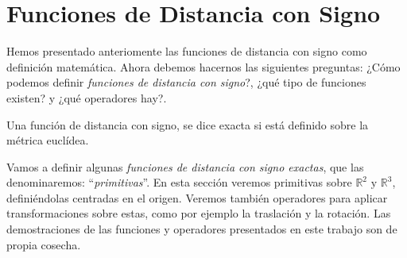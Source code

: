 \chapter{Funciones de Distancia con Signo\label{ch:fds}}
Hemos presentado anteriomente las funciones de distancia con signo como definición matemática. Ahora debemos hacernos las siguientes preguntas: ¿Cómo podemos definir \textit{funciones de distancia con signo}?, ¿qué tipo de funciones existen? y ¿qué operadores hay?.

\begin{definition}
Una función de distancia con signo, se dice exacta si está definido sobre la métrica euclídea.
\end{definition}

Vamos a definir algunas \textit{funciones de distancia con signo exactas}, que las denominaremos: \enquote{\textit{primitivas}}. En esta sección veremos primitivas sobre \(\mathbb{R}^2 \text{ y }\mathbb{R}^3\), definiéndolas centradas en el origen. Veremos también operadores para aplicar transformaciones sobre estas, como por ejemplo la traslación y la rotación. Las demostraciones de las funciones y operadores presentados en este trabajo son de propia cosecha.

